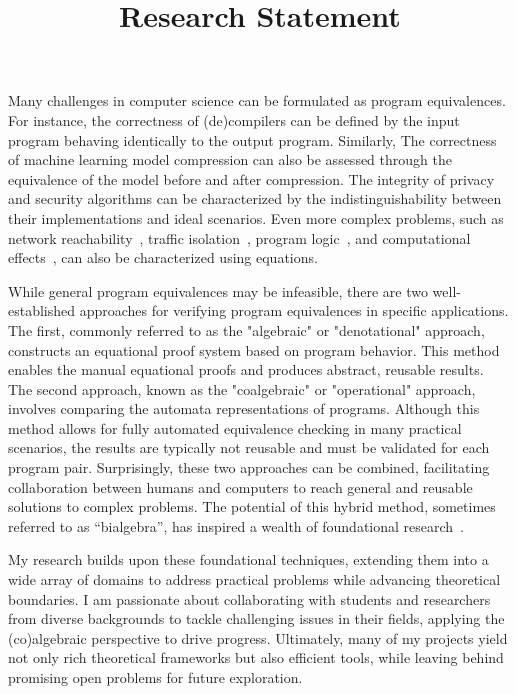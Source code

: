 \documentclass[11pt,a4paper,sans]{moderncv} %
\title{Research Statement}
\begin{document}
\makecvtitle %

\setlength\parskip{8px}

Many challenges in computer science can be formulated as program equivalences. 
For instance, the correctness of (de)compilers can be defined by the input program behaving identically to the output program. 
Similarly, The correctness of machine learning model compression can also be assessed through the equivalence of the model before and after compression.
The integrity of privacy and security algorithms can be characterized by the indistinguishability between their implementations and ideal scenarios. 
Even more complex problems, such as network reachability~\cite{anderson_NetKATSemanticFoundations_2014a}, traffic isolation~\cite{anderson_NetKATSemanticFoundations_2014a}, program logic~\cite{zhang_IncorrectnessLogicKleene_2022,moller_AlgebraProgramCorrectness_2021}, and computational effects~\cite{plotkin_HandlersAlgebraicEffects_2009,plotkin_AdequacyAlgebraicEffects_2001}, can also be characterized using equations.

While general program equivalences may be infeasible, there are two well-established approaches for verifying program equivalences in specific applications. 
The first, commonly referred to as the "algebraic" or "denotational" approach, constructs an equational proof system based on program behavior. 
This method enables the manual equational proofs and produces abstract, reusable results. 
The second approach, known as the "coalgebraic" or "operational" approach, involves comparing the automata representations of programs. 
Although this method allows for fully automated equivalence checking in many practical scenarios, the results are typically not reusable and must be validated for each program pair. 
Surprisingly, these two approaches can be combined, facilitating collaboration between humans and computers to reach general and reusable solutions to complex problems. 
The potential of this hybrid method, sometimes referred to as ``bialgebra'', has inspired a wealth of foundational research~\cite{smolka_GuardedKleeneAlgebra_2020,schmid_GuardedKleeneAlgebra_2021,jacobs_BialgebraicReviewDeterministic_2006,anderson_NetKATSemanticFoundations_2014a,foster_CoalgebraicDecisionProcedure_2015,kozen_CoalgebraicTheoryKleene_2008,schmid_CoalgebraicCompletenessTheorems_2024,rozowski_ProbabilisticGuardedKAT_2023}.

My research builds upon these foundational techniques, extending them into a wide array of domains to address practical problems while advancing theoretical boundaries. 
I am passionate about collaborating with students and researchers from diverse backgrounds to tackle challenging issues in their fields, applying the (co)algebraic perspective to drive progress. 
Ultimately, many of my projects yield not only rich theoretical frameworks but also efficient tools, while leaving behind promising open problems for future exploration.
\end{document}
